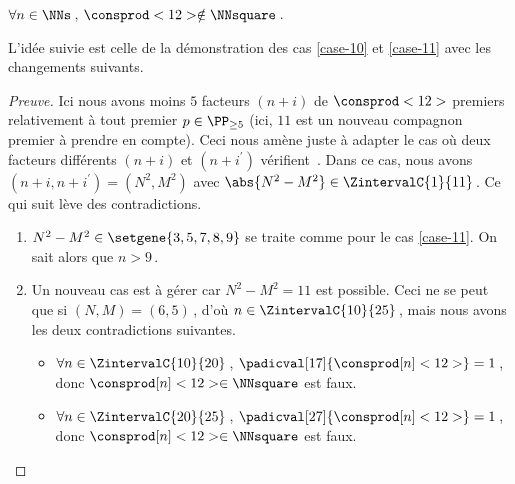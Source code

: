 \begin{fact} \label{case-12}
	 $\forall n \in \NNs$\,, $\consprod<12> \notin \NNsquare$\,.
\end{fact}




L'idée suivie est celle de la démonstration des cas \ref{case-10} et \ref{case-11} avec les changements suivants.


\begin{proof}[Preuve]%
    Ici nous avons moins $5$ facteurs $(n + i)$ de $\consprod<12>$ premiers relativement à tout premier $p \in \PP_{\geq 5}$ (ici, $11$ est un nouveau compagnon premier à prendre en compte).
    Ceci nous amène juste à adapter le cas où deux facteurs différents $(n+i)$ et $(n+i^\prime)$ vérifient \,.
    Dans ce cas, nous avons $(n+i, n+i^\prime) = (N^2, M^2)$ avec $\abs{N^2 - M^2} \in \ZintervalC{1}{11}$\,. Ce qui suit lève des contradictions.
	\begin{enumerate}
		\item $N^2 - M^2 \in \setgene{3, 5, 7, 8, 9}$ se traite comme pour le cas \ref{case-11}. On sait alors que $n > 9$\,.

			
		\item Un nouveau cas est à gérer car $N^2 - M^2 = 11$ est possible.
		Ceci ne se peut que si $(N, M) = (6, 5)$\,, d'où $n \in \ZintervalC{10}{25}$\,, mais nous avons les deux contradictions suivantes.
		\begin{itemize}
			\item $\forall n \in \ZintervalC{10}{20}$\,, 
			$\padicval[17]{\consprod[n]<12>} = 1$\,, donc $\consprod[n]<12> \in \NNsquare$ est faux.

			\item $\forall n \in \ZintervalC{20}{25}$\,, 
			$\padicval[27]{\consprod[n]<12>} = 1$\,, donc $\consprod[n]<12> \in \NNsquare$ est faux.
		\qedhere
		\end{itemize}
	\end{enumerate}
\end{proof}

